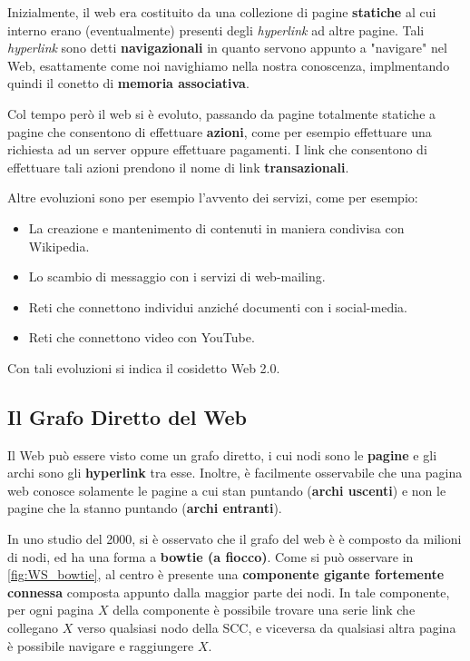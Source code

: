 Inizialmente, il web era costituito da una collezione di pagine \textbf{statiche} al cui interno erano (eventualmente) presenti degli \textit{hyperlink} ad altre pagine. Tali \textit{hyperlink} sono detti \textbf{navigazionali} in quanto servono appunto a "navigare" nel Web, esattamente come noi navighiamo nella nostra conoscenza, implmentando quindi il conetto di \textbf{memoria associativa}.

Col tempo però il web si è evoluto, passando da pagine totalmente statiche a pagine che consentono di effettuare \textbf{azioni}, come per esempio effettuare una richiesta ad un server oppure effettuare pagamenti. I link che consentono di effettuare tali azioni prendono il nome di link \textbf{transazionali}.

Altre evoluzioni sono per esempio l'avvento dei servizi, come per esempio:
\begin{itemize}
    \item La creazione e mantenimento di contenuti in maniera condivisa con Wikipedia.
    \item Lo scambio di messaggio con i servizi di web-mailing.
    \item Reti che connettono individui anziché documenti con i social-media.
    \item Reti che connettono video con YouTube.
\end{itemize}

Con tali evoluzioni si indica il cosidetto Web 2.0.

\subsection{Il Grafo Diretto del Web}

Il Web può essere visto come un grafo diretto, i cui nodi sono le \textbf{pagine} e gli archi sono gli \textbf{hyperlink} tra esse. Inoltre, è facilmente osservabile che una pagina web conosce solamente le pagine a cui stan puntando (\textbf{archi uscenti}) e non le pagine che la stanno puntando (\textbf{archi entranti}).

In uno studio del 2000, si è osservato che il grafo del web è è composto da milioni di nodi, ed ha una forma a \textbf{bowtie (a fiocco)}. Come si può osservare in \autoref{fig:WS_bowtie}, al centro è presente una \textbf{componente gigante fortemente  connessa} composta appunto dalla maggior parte dei nodi. In tale componente, per ogni pagina $X$ della componente è possibile trovare una serie link che collegano $X$ verso qualsiasi nodo della SCC, e viceversa da qualsiasi altra pagina è possibile navigare e raggiungere $X$.


